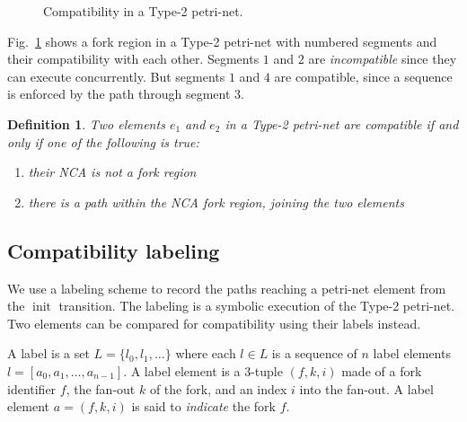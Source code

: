 \documentclass[conference]{IEEEtran}
\newtheorem{definition}{Definition}[section]
\newcommand{\sym}[1]{$\operatorname{#1}$}
\begin{document}
\begin{figure}[!t]
  \centering
  \caption{Compatibility in a Type-2 petri-net.}
  \label{figure:compatibility-fork}
\end{figure}

Fig.~\ref{figure:compatibility-fork} shows a fork region in a Type-2
petri-net with numbered segments and their compatibility with each
other. Segments $1$ and $2$ are \emph{incompatible} since they can
execute concurrently. But segments $1$ and $4$ are compatible, since a
sequence is enforced by the path through segment $3$.

\begin{definition} Two elements $e_1$ and $e_2$ in a Type-2 petri-net
are compatible if and only if one of the following is true:
\begin{enumerate}
\item their NCA is {\em not} a fork region
\item there is a path within the NCA fork region, joining the two elements
\end{enumerate}
\end{definition}

\subsection{Compatibility labeling}

We use a labeling scheme to record the paths reaching a petri-net
element from the \sym{init} transition. The labeling is a symbolic
execution of the Type-2 petri-net. Two elements can be compared for
compatibility using their labels instead.

A label is a set $L = \{l_0,l_1,\ldots\}$ where each $l \in L$ is a
sequence of $n$ label elements $l = [a_0,a_1,\ldots,a_{n-1}]$. A label
element is a 3-tuple $(f,k,i)$ made of a fork identifier $f$, the
fan-out $k$ of the fork, and an index $i$ into the fan-out. A label
element $a = (f,k,i)$ is said to {\it indicate} the fork $f$.
\end{document}
